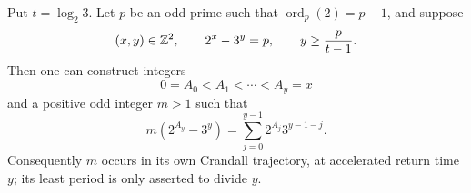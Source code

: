 \begin{proposition}
\label{prop:Crandall-primitive-root-return}
Put $t=\log_2 3$.  Let $p$ be an odd prime such that
\(\operatorname{ord}_p(2)=p-1\), and suppose
\begin{equation}
\label{eq:Crandall-primitive-root-input}
 (x,y)\in\mathbb{Z}^2,
 \qquad 2^x-3^y=p,
 \qquad y\geq\frac{p}{t-1}.
\end{equation}
Then one can construct integers
\[
 0=A_0<A_1<\cdots<A_y=x
\]
and a positive odd integer $m>1$ such that
\begin{equation}
\label{eq:Crandall-primitive-root-return}
 m(2^{A_y}-3^y)
 =\sum_{j=0}^{y-1}2^{A_j}3^{y-1-j}.
\end{equation}
Consequently $m$ occurs in its own Crandall trajectory, at accelerated
return time $y$; its least period is only asserted to divide $y$.
\end{proposition}

